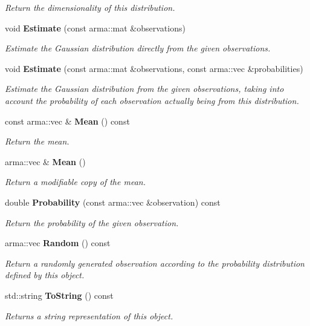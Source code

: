 \begin{DoxyCompactItemize}
\begin{DoxyCompactList}\small\item\em Return the dimensionality of this distribution. \end{DoxyCompactList}\item 
void {\bf Estimate} (const arma\-::mat \&observations)
\begin{DoxyCompactList}\small\item\em Estimate the Gaussian distribution directly from the given observations. \end{DoxyCompactList}\item 
void {\bf Estimate} (const arma\-::mat \&observations, const arma\-::vec \&probabilities)
\begin{DoxyCompactList}\small\item\em Estimate the Gaussian distribution from the given observations, taking into account the probability of each observation actually being from this distribution. \end{DoxyCompactList}\item 
const arma\-::vec \& {\bf Mean} () const 
\begin{DoxyCompactList}\small\item\em Return the mean. \end{DoxyCompactList}\item 
arma\-::vec \& {\bf Mean} ()
\begin{DoxyCompactList}\small\item\em Return a modifiable copy of the mean. \end{DoxyCompactList}\item 
double {\bf Probability} (const arma\-::vec \&observation) const 
\begin{DoxyCompactList}\small\item\em Return the probability of the given observation. \end{DoxyCompactList}\item 
arma\-::vec {\bf Random} () const 
\begin{DoxyCompactList}\small\item\em Return a randomly generated observation according to the probability distribution defined by this object. \end{DoxyCompactList}\item 
std\-::string {\bf To\-String} () const 
\begin{DoxyCompactList}\small\item\em Returns a string representation of this object. \end{DoxyCompactList}\end{DoxyCompactItemize}
